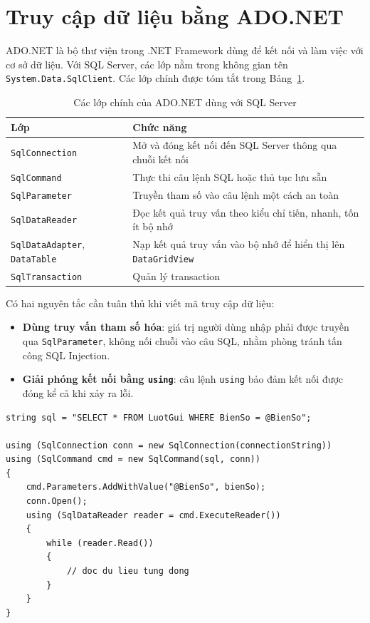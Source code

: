 \section{Truy cập dữ liệu bằng ADO.NET}

ADO.NET là bộ thư viện trong .NET Framework dùng để kết nối và làm việc với cơ sở dữ liệu. Với SQL Server, các lớp nằm trong không gian tên \texttt{System.Data.SqlClient}. Các lớp chính được tóm tắt trong Bảng~\ref{tab:adonet}.

\begin{table}[h]
  \centering
  \begin{tabular}{@{}lp{9cm}@{}}
    \toprule
    \textbf{Lớp} & \textbf{Chức năng} \\
    \midrule
    \texttt{SqlConnection} & Mở và đóng kết nối đến SQL Server thông qua chuỗi kết nối \\
    \texttt{SqlCommand} & Thực thi câu lệnh SQL hoặc thủ tục lưu sẵn \\
    \texttt{SqlParameter} & Truyền tham số vào câu lệnh một cách an toàn \\
    \texttt{SqlDataReader} & Đọc kết quả truy vấn theo kiểu chỉ tiến, nhanh, tốn ít bộ nhớ \\
    \texttt{SqlDataAdapter}, \texttt{DataTable} & Nạp kết quả truy vấn vào bộ nhớ để hiển thị lên \texttt{DataGridView} \\
    \texttt{SqlTransaction} & Quản lý transaction \\
    \bottomrule
  \end{tabular}
  \caption{Các lớp chính của ADO.NET dùng với SQL Server}
  \label{tab:adonet}
\end{table}

Có hai nguyên tắc cần tuân thủ khi viết mã truy cập dữ liệu:

\begin{itemize}
  \item \textbf{Dùng truy vấn tham số hóa}: giá trị người dùng nhập phải được truyền qua \texttt{SqlParameter}, không nối chuỗi vào câu SQL, nhằm phòng tránh tấn công SQL Injection.
  \item \textbf{Giải phóng kết nối bằng \texttt{using}}: câu lệnh \texttt{using} bảo đảm kết nối được đóng kể cả khi xảy ra lỗi.
\end{itemize}

\begin{lstlisting}
string sql = "SELECT * FROM LuotGui WHERE BienSo = @BienSo";

using (SqlConnection conn = new SqlConnection(connectionString))
using (SqlCommand cmd = new SqlCommand(sql, conn))
{
    cmd.Parameters.AddWithValue("@BienSo", bienSo);
    conn.Open();
    using (SqlDataReader reader = cmd.ExecuteReader())
    {
        while (reader.Read())
        {
            // doc du lieu tung dong
        }
    }
}
\end{lstlisting}

